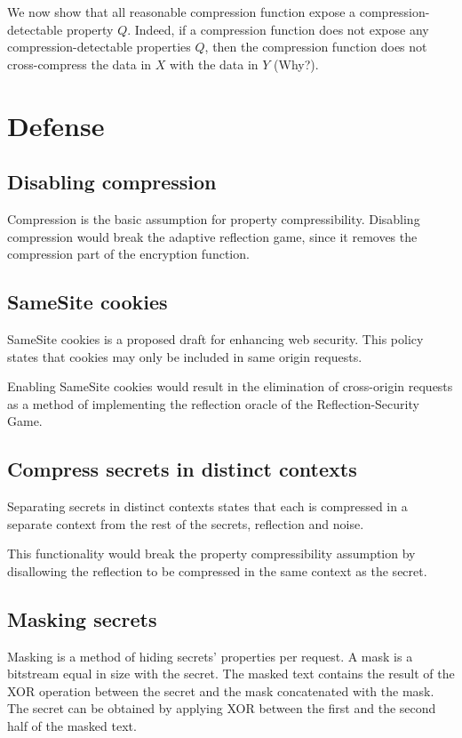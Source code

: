 \documentclass[a4paper, 11 pt, conference]{article}
\begin{document}
We now show that all reasonable compression function expose a
compression-detectable property $Q$. Indeed, if a compression function does not
expose any compression-detectable properties $Q$, then the compression function
does not cross-compress the data in $X$ with the data in $Y$ (Why?).

\section{Defense}\label{sec:defense}

\subsection{Disabling compression}\label{subsec:disablecom}
Compression is the basic assumption for property compressibility. Disabling
compression would break the adaptive reflection game, since it removes
the compression part of the encryption function.

\subsection{SameSite cookies}\label{subsec:samesite}
SameSite cookies \cite{c1} is a proposed draft for enhancing web security. This policy
states that cookies may only be included in same origin requests.

Enabling SameSite cookies would result in the elimination of cross-origin
requests as a method of implementing the reflection oracle of the
Reflection-Security Game.

\subsection{Compress secrets in distinct contexts}\label{subsec:contexts}
Separating secrets in distinct contexts states that each is compressed
in a separate context from the rest of the secrets, reflection and noise.

This functionality would break the property compressibility assumption by
disallowing the reflection to be compressed in the same context as the secret.

\subsection{Masking secrets}\label{subsec:masking}
Masking is a method of hiding secrets' properties per request. A mask is a
bitstream equal in size with the secret. The masked text contains the result of
the XOR operation between the secret and the mask concatenated with the mask.
The secret can be obtained by applying XOR between the first and the second
half of the masked text.
\end{document}
